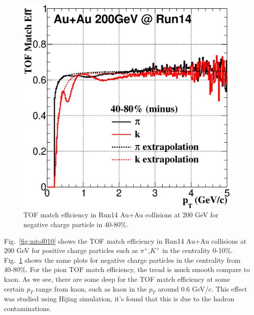 \documentclass[a4paper]{article}
\begin{document}
\begin{figure}[htbp]
\begin{minipage}[htbp]{0.52\linewidth}
\includegraphics[width=1.0\textwidth]{fig/tofMatch_minus_Eff_Run14_Fit_cent3.eps} 
\caption{TOF match efficiency in Run14 Au+Au collisions at 200 GeV for negative charge particle in 40-80\%. \label{fig:mtof4080}}
\end{minipage}
\end{figure}


Fig.~\ref{fig:mtof010} shows the TOF match efficiency in Run14 Au+Au collisions at 200 GeV for positive charge particles such as $\pi^{+}$,$K^{+}$ in the centrality 0-10\%. Fig.~\ref{fig:mtof4080} shows the same plots for negative charge particles in the centrality from 40-80\%. For the pion TOF match efficiency, the tread is much smooth compare to kaon. As we see, there are some deep for the TOF match efficiency at some certain $p_{T}$ range from kaon, such as kaon in the $p_{T}$ around 0.6 GeV/$c$. This effect was studied using Hijing simulation, it's found that this is due to the hadron contaminations. 
\end{document}
